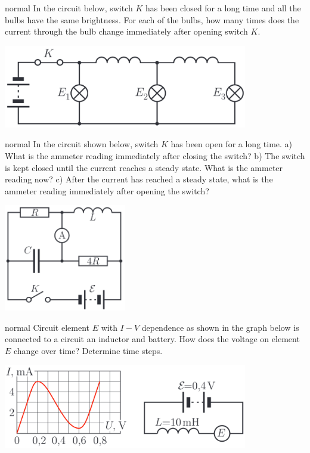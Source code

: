 \hypertarget{P138}{}
\begin{solution}{normal} %
In the circuit below, switch $K$ has been closed for a long time and all the bulbs have the same brightness. For each of the bulbs, how many times does the current through the bulb change immediately after opening switch $K$.
\begin{center}
    \includegraphics[width=0.8\textwidth]{S5 Figures/S5-138.png}
\end{center}
\end{solution}
\newpage
\hypertarget{P139}{}
\begin{solution}{normal} %
In the circuit shown below, switch $K$ has been open for a long time. a) What is the ammeter reading immediately after closing the switch? b) The switch is kept closed until the current reaches a steady state. What is the ammeter reading now? c) After the current has reached a steady state, what is the ammeter reading immediately after opening the switch?
\begin{center}
    \includegraphics[width=0.4\textwidth]{S5 Figures/S5-139.png}
\end{center}
\end{solution}

\hypertarget{P140}{}
\begin{solution}{normal} %
Circuit element $E$ with $I-V$ dependence as shown in the graph below is connected to a circuit an inductor and battery. How does the voltage on element $E$ change over time? Determine time steps.
\begin{center}
    \includegraphics[width=0.8\textwidth]{S5 Figures/S5-140.png}
\end{center}
\end{solution}

